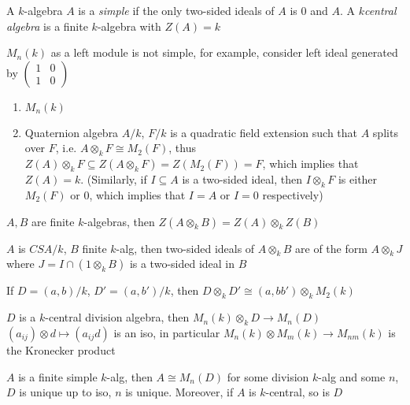 \documentclass[a4paper,10pt]{article}
\begin{document}
\begin{definition}
A $k$-algebra $A$ is a \textit{simple} if the only two-sided ideals of $A$ is $0$ and $A$. A $k$\textit{central algebra} is a finite $k$-algebra with $Z(A)=k$
\end{definition}

\begin{example}
$M_n(k)$ as a left module is not simple, for example, consider left ideal  generated by $\begin{pmatrix}1&0\\1&0\end{pmatrix}$
\end{example}

\begin{example}
\begin{enumerate}
\item $M_n(k)$
\item Quaternion algebra $A/k$, $F/k$ is a quadratic field extension such that $A$ splits over $F$, i.e. $A\otimes_kF\cong M_2(F)$, thus $Z(A)\otimes_k F\subseteq Z(A\otimes_kF)=Z(M_2(F))=F$, which implies that $Z(A)=k$. (Similarly, if $I\subseteq A$ is a two-sided ideal, then $I\otimes_kF$ is either $M_2(F)$ or $0$, which implies that $I=A$ or $I=0$ respectively)
\end{enumerate}
\end{example}

\begin{proposition}
$A,B$ are finite $k$-algebras, then $Z(A\otimes_kB)=Z(A)\otimes_kZ(B)$
\end{proposition}

\begin{proposition}
$A$ is $CSA/k$, $B$ finite $k$-alg, then two-sided ideals of $A\otimes_kB$ are of the form $A\otimes_kJ$ where $J=I\cap(1\otimes_kB)$ is a two-sided ideal in $B$
\end{proposition}

\begin{example}
If $D=(a,b)/k$, $D'=(a,b')/k$, then $D\otimes_kD'\cong(a,bb')\otimes_kM_2(k)$
\end{example}

\begin{example}
$D$ is a $k$-central division algebra, then $M_n(k)\otimes_kD\to M_n(D)$ $(a_{ij})\otimes d\mapsto(a_{ij}d)$ is an iso, in particular $M_n(k)\otimes M_m(k)\to M_{nm}(k)$ is the Kronecker product
\end{example}

\begin{theorem}\label{Wedderburn's theorem}
$A$ is a finite simple $k$-alg, then $A\cong M_n(D)$ for some division $k$-alg and some $n$, $D$ is unique up to iso, $n$ is unique. Moreover, if $A$ is $k$-central, so is $D$
\end{theorem}
\end{document}

